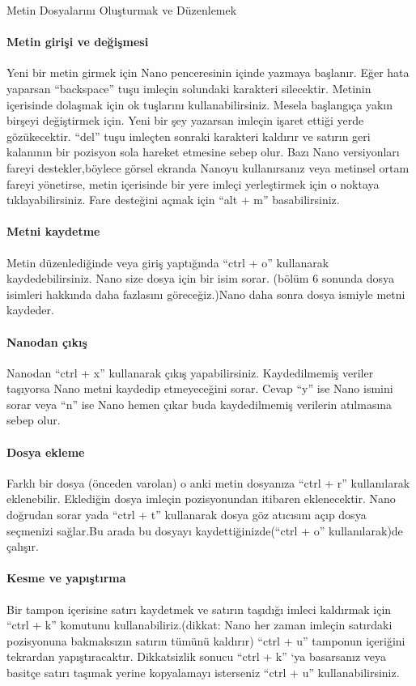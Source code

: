 \documentclass[10pt,a5paper]{book}
\begin{document}
\begin{section}{Metin Dosyalarını Oluşturmak ve Düzenlemek}
\paragraph{ Metin girişi ve değişmesi}{ Yeni bir metin girmek için Nano penceresinin içinde yazmaya başlanır. Eğer hata yaparsan “backspace” tuşu imleçin solundaki karakteri silecektir. Metinin içerisinde dolaşmak için ok tuşlarını kullanabilirsiniz. Mesela başlangıça yakın birşeyi değiştirmek için. Yeni bir şey yazarsan imleçin işaret ettiği yerde gözükecektir. “del” tuşu imleçten sonraki karakteri kaldırır ve satırın geri kalanının bir pozisyon sola hareket etmesine sebep olur. Bazı Nano versiyonları fareyi destekler,böylece görsel ekranda Nanoyu kullanırsanız veya metinsel ortam fareyi yönetirse, metin içerisinde bir yere imleçi yerleştirmek için o noktaya tıklayabilirsiniz. Fare desteğini açmak için “alt + m” basabilirsiniz. }

\paragraph{ Metni kaydetme}{ Metin düzenlediğinde veya giriş yaptığında “ctrl + o” kullanarak kaydedebilirsiniz. Nano size dosya için bir isim sorar. (bölüm 6 sonunda dosya isimleri hakkında daha fazlasını göreceğiz.)Nano daha sonra dosya ismiyle metni kaydeder.}

\paragraph{ Nanodan çıkış}{ Nanodan “ctrl + x” kullanarak çıkış yapabilirsiniz. Kaydedilmemiş veriler taşıyorsa Nano metni kaydedip etmeyeceğini sorar. Cevap “y”  ise Nano ismini sorar veya “n” ise Nano hemen çıkar buda kaydedilmemiş verilerin atılmasına sebep olur.}
\paragraph{ Dosya ekleme}{ Farklı bir dosya (önceden varolan) o anki metin dosyanıza “ctrl + r” kullanılarak eklenebilir.  Eklediğin dosya imleçin pozisyonundan itibaren eklenecektir. Nano doğrudan sorar yada “ctrl + t” kullanarak dosya göz atıcısını açıp dosya seçmenizi sağlar.Bu arada bu dosyayı kaydettiğinizde(“ctrl + o” kullanılarak)de çalışır. }
\paragraph{ Kesme ve yapıştırma}{ Bir tampon içerisine satırı kaydetmek ve satırın taşıdığı imleci kaldırmak için “ctrl + k” komutunu kullanabiliriz.(dikkat: Nano her zaman imleçin satırdaki pozisyonuna bakmaksızın satırın tümünü kaldırır) “ctrl + u” tamponun içeriğini tekrardan yapıştıracaktır. Dikkatsizlik sonucu “ctrl + k” ‘ya basarsanız veya basitçe satırı taşımak yerine kopyalamayı isterseniz “ctrl + u” kullanabilirsiniz.}


\end{section}
\end{document}
